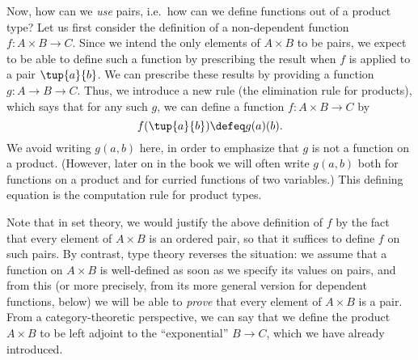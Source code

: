Now, how can we \emph{use} pairs, i.e.\ how can we define functions out of a product type?
Let us first consider the definition of a non-dependent function $f : A\times B \to C$.
Since we intend the only elements of $A\times B$ to be pairs, we expect to be able to define such a function by prescribing the result
when $f$ is applied to a pair $\tup{a}{b}$.
We can prescribe these results by providing a function $g : A \to B \to C$.
Thus, we introduce a new rule (the elimination rule for products), which says that for any such $g$, we can define a function $f : A\times B \to C$ by
\[ f(\tup{a}{b}) \defeq g(a)(b). \]
We avoid writing $g(a,b)$ here, in order to emphasize that $g$ is not a function on a product.
(However, later on in the book we will often write $g(a,b)$ both for functions on a product and for curried functions of two variables.)
This defining equation is the computation rule for product types.

Note that in set theory, we would justify the above definition of $f$ by the fact that every element of $A\times B$ is an ordered pair, so that it suffices to define $f$ on such pairs.
By contrast, type theory reverses the situation: we assume that a function on $A\times B$ is well-defined as soon as we specify its values on pairs, and from this (or more precisely, from its more general version for dependent functions, below) we will be able to \emph{prove} that every element of $A\times B$ is a pair.
From a category-theoretic perspective, we can say that we define the product $A\times B$ to be left adjoint to the ``exponential'' $B\to C$, which we have already introduced.

